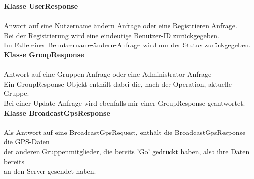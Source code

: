\textbf{Klasse UserResponse}\\
\\
Anwort auf eine Nutzername ändern Anfrage oder eine Registrieren Anfrage.\\
Bei der Registrierung wird eine eindeutige Benutzer-ID zurückgegeben.\\
Im Falle einer Benutzername-ändern-Anfrage wird nur der Status zurückgegeben.\\

\textbf{Klasse GroupResponse}\\
\\
Antwort auf eine Gruppen-Anfrage oder eine Administrator-Anfrage.\\
Ein GroupResponse-Objekt enthält dabei die, nach der Operation, aktuelle Gruppe.\\
Bei einer Update-Anfrage wird ebenfalls mir einer GroupResponse geantwortet.\\

\textbf{Klasse BroadcastGpsResponse}\\
\\
Als Antwort auf eine BroadcastGpsRequest, enthält die BroadcastGpsResponse die GPS-Daten\\
der anderen Gruppenmitglieder, die bereits 'Go' gedrückt haben, also ihre Daten bereits\\
an den Server gesendet haben.\\
\newpage


